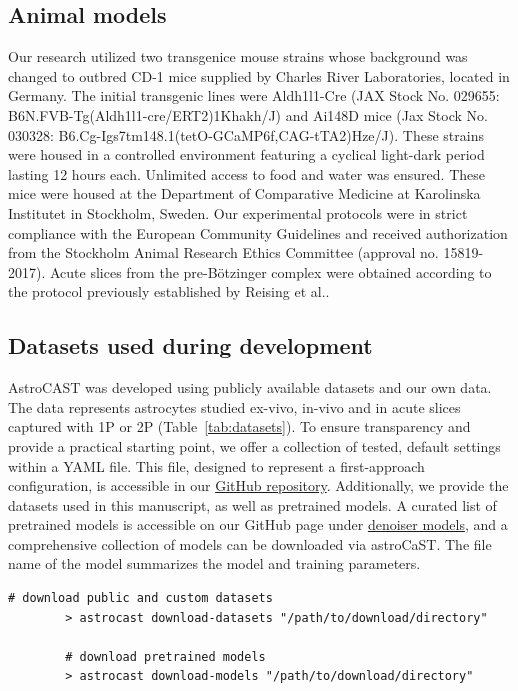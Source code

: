 \documentclass[utf8]{FrontiersinHarvard}
\newcommand{\tref}[1]{ (Table~\ref{tab:#1})}
\begin{document}
    \subsection{Animal models}
    Our research utilized two transgenice mouse strains whose background was changed to outbred CD-1 mice supplied by Charles River Laboratories, located in Germany. The initial transgenic lines were Aldh1l1-Cre (JAX Stock No. 029655: B6N.FVB-Tg(Aldh1l1-cre/ERT2)1Khakh/J) and Ai148D mice (Jax Stock No. 030328: B6.Cg-Igs7tm148.1(tetO-GCaMP6f,CAG-tTA2)Hze/J). These strains were housed in a controlled environment featuring a cyclical light-dark period lasting 12 hours each. Unlimited access to food and water was ensured. These mice were housed at the Department of Comparative Medicine at Karolinska Institutet in Stockholm, Sweden. Our experimental protocols were in strict compliance with the European Community Guidelines and received authorization from the Stockholm Animal Research Ethics Committee (approval no. 15819-2017). Acute slices from the pre-Bötzinger complex were obtained according to the protocol previously established by Reising et al.\citep{reising_prostaglandin_2022}.

    \subsection{Datasets used during development}
    \label{ref:dataset-availability}

    AstroCAST was developed using publicly available datasets and our own data. The data represents astrocytes studied ex-vivo, in-vivo and in acute slices captured with \ac{1P} or \ac{2P}\tref{datasets}. To ensure transparency and provide a practical starting point, we offer a collection of tested, default settings within a YAML file. This file, designed to represent a first-approach configuration, is accessible in our \href{https://github.com/janreising/astroCAST}{GitHub repository}. Additionally, we provide the datasets used in this manuscript, as well as pretrained models. A curated list of pretrained models is accessible on our GitHub page under \href{https://github.com/janreising/astroCAST/tree/main/denoiser_models}{denoiser models}, and a comprehensive collection of models can be downloaded via astroCaST. The file name of the model summarizes the model and training parameters.

    \begin{lstlisting}[style=bashStyle]
        # download public and custom datasets
        > astrocast download-datasets "/path/to/download/directory"

        # download pretrained models
        > astrocast download-models "/path/to/download/directory"
    \end{lstlisting}
\end{document}
